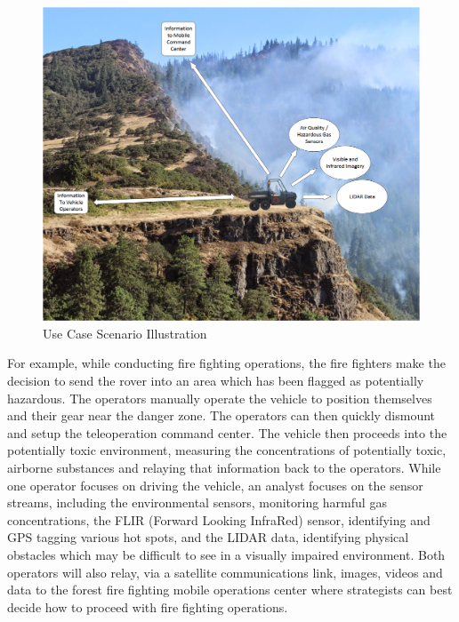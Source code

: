 \begin{figure}[H]
\centering
\includegraphics[width=0.75\linewidth]{UseCaseIllustration}
\caption{Use Case Scenario Illustration}
\label{fig:usecase}
\end{figure}
For example, while conducting fire fighting operations, the fire fighters make the decision to send the rover into an area which has been flagged as potentially hazardous. The operators manually operate the vehicle to position themselves and their gear near the danger zone. The operators can then quickly dismount and setup the teleoperation command center. The vehicle then proceeds into the potentially toxic environment, measuring the concentrations of potentially toxic, airborne substances and relaying that information back to the operators. While one operator focuses on driving the vehicle, an analyst focuses on the sensor streams, including the environmental sensors, monitoring harmful gas concentrations, the FLIR (Forward Looking InfraRed) sensor, identifying and GPS tagging various hot spots, and the LIDAR data, identifying physical obstacles which may be difficult to see in a visually impaired environment. Both operators will also relay, via a satellite communications link, images, videos and data to the forest fire fighting mobile operations center where strategists can best decide how to proceed with fire fighting operations.
%
